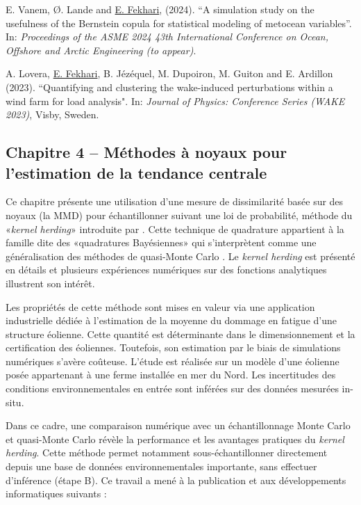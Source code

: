 \medskip
\noindent
{} E. Vanem, \O{}. Lande and \underline{E. Fekhari}, (2024). ``A simulation study on the usefulness of the Bernstein copula for statistical modeling of metocean variables''. In: \textit{Proceedings of the ASME 2024 43th International Conference on Ocean, Offshore and Arctic Engineering (to appear)}.

\medskip
\noindent
{} A. Lovera, \underline{E. Fekhari}, B. J\'{e}z\'{e}quel, M. Dupoiron, M. Guiton and E. Ardillon (2023). ``Quantifying and clustering the wake-induced perturbations within a wind farm for load analysis". In: \textit{Journal of Physics: Conference Series (WAKE 2023)}, Visby, Sweden.
 

\subsection*{Chapitre 4 -- M\'{e}thodes à noyaux pour l'estimation de la tendance centrale}

Ce chapitre pr\'{e}sente une utilisation d'une mesure de dissimilarit\'{e} bas\'{e}e sur des noyaux (la MMD) pour \'{e}chantillonner suivant une loi de probabilit\'{e}, m\'{e}thode du «\textit{kernel herding}» introduite par \citet{chen_welling_2010}. 
Cette technique de quadrature appartient à la famille dite des «quadratures Bay\'{e}siennes» \citep{briol_oates_2019} qui s'interprètent comme une g\'{e}n\'{e}ralisation des m\'{e}thodes de quasi-Monte Carlo \citep{hickernell_2020}. 
Le \textit{kernel herding} est pr\'{e}sent\'{e} en d\'{e}tails et plusieurs exp\'{e}riences num\'{e}riques sur des fonctions analytiques illustrent son int\'{e}rêt. 

Les propri\'{e}t\'{e}s de cette m\'{e}thode sont mises en valeur via une application industrielle d\'{e}di\'{e}e à l'estimation de la moyenne du dommage en fatigue d'une structure \'{e}olienne. 
Cette quantit\'{e} est d\'{e}terminante dans le dimensionnement et la certification des \'{e}oliennes. 
Toutefois, son estimation par le biais de simulations num\'{e}riques s'avère coûteuse. 
L'\'{e}tude est r\'{e}alis\'{e}e sur un modèle d'une \'{e}olienne pos\'{e}e appartenant à une ferme install\'{e}e en mer du Nord. 
Les incertitudes des conditions environnementales en entr\'{e}e sont inf\'{e}r\'{e}es sur des donn\'{e}es mesur\'{e}es in-situ. 

Dans ce cadre, une comparaison num\'{e}rique avec un \'{e}chantillonnage Monte Carlo et quasi-Monte Carlo r\'{e}vèle la performance et les avantages pratiques du \textit{kernel herding}.
Cette m\'{e}thode permet notamment sous-\'{e}chantillonner directement depuis une base de donn\'{e}es environnementales importante, sans effectuer d'inf\'{e}rence (\'{e}tape B). 
Ce travail a men\'{e} à la publication et aux d\'{e}veloppements informatiques suivants : 

